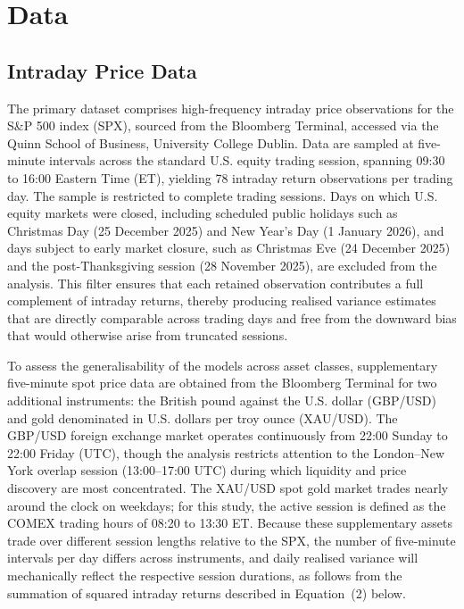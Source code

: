 
\section{Data}
\subsection{Intraday Price Data}

The primary dataset comprises high-frequency intraday price observations for the S\&P 500 index (SPX), sourced from the Bloomberg Terminal, accessed via the Quinn School of Business, University College Dublin. Data are sampled at five-minute intervals across the standard U.S. equity trading session, spanning 09:30 to 16:00 Eastern Time (ET), yielding 78 intraday return observations per trading day. The sample is restricted to complete trading sessions. Days on which U.S. equity markets were closed, including scheduled public holidays such as Christmas Day (25 December 2025) and New Year's Day (1 January 2026), and days subject to early market closure, such as Christmas Eve (24 December 2025) and the post-Thanksgiving session (28 November 2025), are excluded from the analysis. This filter ensures that each retained observation contributes a full complement of intraday returns, thereby producing realised variance estimates that are directly comparable across trading days and free from the downward bias that would otherwise arise from truncated sessions.

To assess the generalisability of the models across asset classes, supplementary five-minute spot price data are obtained from the Bloomberg Terminal for two additional instruments: the British pound against the U.S. dollar (GBP/USD) and gold denominated in U.S. dollars per troy ounce (XAU/USD). The GBP/USD foreign exchange market operates continuously from 22:00 Sunday to 22:00 Friday (UTC), though the analysis restricts attention to the London--New York overlap session (13:00--17:00 UTC) during which liquidity and price discovery are most concentrated. The XAU/USD spot gold market trades nearly around the clock on weekdays; for this study, the active session is defined as the COMEX trading hours of 08:20 to 13:30 ET. Because these supplementary assets trade over different session lengths relative to the SPX, the number of five-minute intervals per day differs across instruments, and daily realised variance will mechanically reflect the respective session durations, as follows from the summation of squared intraday returns described in Equation~(2) below.

